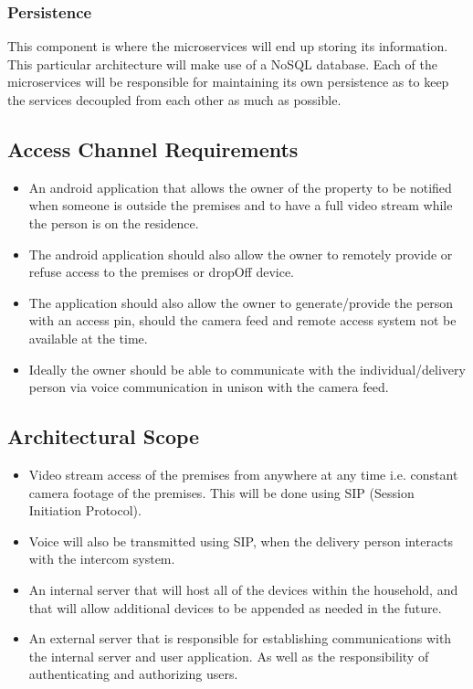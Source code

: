 \documentclass[a4paper,12pt]{article}
\begin{document}
	\subsubsection{Persistence}
	This component is where the microservices will end up storing its information. This particular architecture will make use of a NoSQL database. Each of the microservices will be responsible for maintaining its own persistence as to keep the services decoupled from each other as much as possible.
	
	\subsection{Access Channel Requirements}
	\begin{itemize}
		\item An android application that allows the owner of the property to be notified when someone is outside the premises and to have a full video stream while the person is on the residence.
		
		\item The android application should also allow the owner to remotely provide or refuse access to the premises or dropOff device.
		
		\item The application should also allow the owner to generate/provide the person with an access pin, should the camera feed and remote access system not be available at the time.  
		
		\item Ideally the owner should be able to communicate with the individual/delivery person via voice communication in unison with the camera feed. 
	\end{itemize}
	
	\newpage
	\subsection{Architectural Scope}
	\begin{itemize}
		\item Video stream access of the premises from anywhere at any time i.e. constant camera footage of the premises. This will be done using SIP (Session Initiation Protocol).
		
		\item Voice will also be transmitted using SIP, when the delivery person interacts with the intercom system.
		
		\item An internal server that will host all of the devices within the household, and that will allow additional devices to be appended as needed in the future.
		
		\item An external server that is responsible for establishing communications with the internal server and user application. As well as the responsibility of authenticating and authorizing users. 
	\end{itemize}
	
\end{document}
